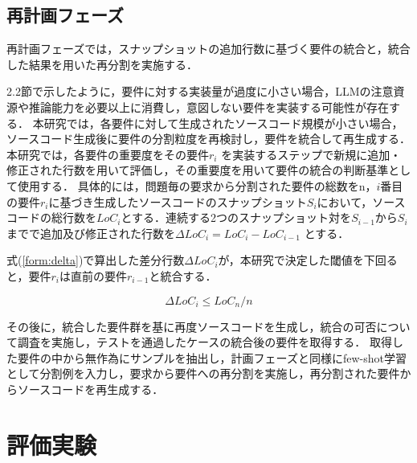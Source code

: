 \documentclass[submit,techrep,noauthor]{ipsj}
\begin{document}
\subsection{再計画フェーズ}
再計画フェーズでは，スナップショットの追加行数に基づく要件の統合と，統合した結果を用いた再分割を実施する．

2.2節で示したように，要件に対する実装量が過度に小さい場合，LLMの注意資源や推論能力を必要以上に消費し，意図しない要件を実装する可能性が存在する\cite{tosem}．
本研究では，各要件に対して生成されたソースコード規模が小さい場合，ソースコード生成後に要件の分割粒度を再検討し，要件を統合して再生成する．
本研究では，各要件の重要度をその要件$r_i$ を実装するステップで新規に追加・修正された行数を用いて評価し，その重要度を用いて要件の統合の判断基準として使用する．
具体的には，問題毎の要求から分割された要件の総数をn，$i$番目の要件$r_i$に基づき生成したソースコードのスナップショット$S_i$において，ソースコードの総行数を$LoC_i$とする．連続する2つのスナップショット対を$S_{i-1}$から$S_i$までで追加及び修正された行数を$\Delta LoC_i = LoC_i - LoC_{i-1}$ とする．

式(\ref{form:delta})で算出した差分行数$\Delta LoC_i$が，本研究で決定した閾値を下回ると，要件$r_i$は直前の要件$r_{i-1}$と統合する．

\begin{equation}\label{form:delta}
    \Delta LoC_i \leq LoC_n / n
\end{equation}

その後に，統合した要件群を基に再度ソースコードを生成し，統合の可否について調査を実施し，テストを通過したケースの統合後の要件を取得する．
取得した要件の中から無作為にサンプルを抽出し，計画フェーズと同様にfew-shot学習として分割例を入力し，要求から要件への再分割を実施し，再分割された要件からソースコードを再生成する．


\section{評価実験}
\label{sec:evaluation}

\end{document}
